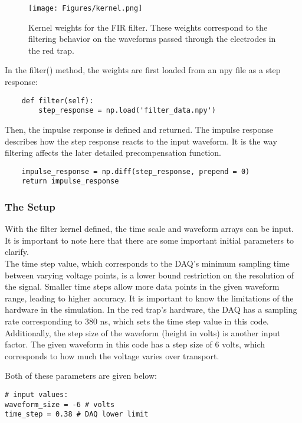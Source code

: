 \documentclass[11pt, a4paper]{article}
\theoremstyle{definition}
\numberwithin{equation}{section}
\begin{document}
\begin{figure}[h!]
    \centering
\texttt{[image: Figures/kernel.png]}
    \caption{Kernel weights for the FIR filter. These weights correspond to the filtering behavior on the waveforms passed through the electrodes in the red trap.}
\end{figure} \label{kernel}

In the filter() method, the weights are first loaded from an npy file as a step response:

\begin{verbatim}
    def filter(self):
        step_response = np.load('filter_data.npy')
\end{verbatim}

Then, the impulse response is defined and returned. The impulse response describes how the step response reacts to the input waveform. It is the way filtering affects the later detailed precompensation function.

\begin{verbatim}
    impulse_response = np.diff(step_response, prepend = 0)
    return impulse_response
\end{verbatim}

\subsubsection{The Setup}
With the filter kernel defined, the time scale and waveform arrays can be input. It is important to note here that there are some important initial parameters to clarify. 
\\
The time step value, which corresponds to the DAQ's minimum sampling time between varying voltage points, is a lower bound restriction on the resolution of the signal. Smaller time steps allow more data points in the given waveform range, leading to higher accuracy. It is important to know the limitations of the hardware in the simulation. In the red trap's hardware, the DAQ has a sampling rate corresponding to 380 ns, which sets the time step value in this code.
\\
Additionally, the step size of the waveform (height in volts) is another input factor. The given waveform in this code has a step size of 6 volts, which corresponds to how much the voltage varies over transport.

Both of these parameters are given below:

\begin{verbatim}
# input values:
waveform_size = -6 # volts
time_step = 0.38 # DAQ lower limit
\end{verbatim}
\end{document}
